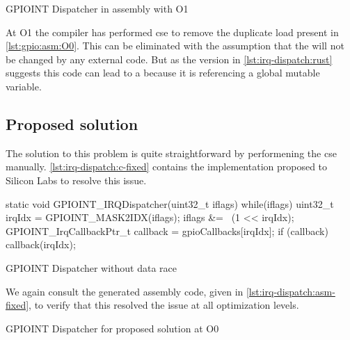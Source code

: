 \begin{listing}[H]
  \caption{GPIOINT Dispatcher in assembly with O1}
  \label{lst:gpio:asm:O1}
\end{listing}

At O1 the compiler has performed \gls{cse} to remove the duplicate load present in \autoref{lst:gpio:asm:O0}.
This can be eliminated with the assumption that the  will not be changed by any external code.
But as the {\rust} version in \autoref{lst:irq-dispatch:rust} suggests this code can lead to a  because it is referencing a global mutable variable.

\subsection{Proposed solution}

The solution to this problem is quite straightforward by performening the \gls{cse} manually.
\autoref{lst:irq-dispatch:c-fixed} contains the implementation proposed to Silicon Labs to resolve this issue.

\begin{listing}[H]
  \begin{ccode}
static void GPIOINT_IRQDispatcher(uint32_t iflags) {
  while(iflags) {
    uint32_t irqIdx = GPIOINT_MASK2IDX(iflags);
    iflags &= ~(1 << irqIdx);
    GPIOINT_IrqCallbackPtr_t callback = gpioCallbacks[irqIdx];
    if (callback) {
      callback(irqIdx);
    }
  }
}
  \end{ccode}
  \caption{GPIOINT Dispatcher without data race}
  \label{lst:irq-dispatch:c-fixed}
\end{listing}

We again consult the generated assembly code, given in \autoref{lst:irq-dispatch:asm-fixed}, to verify that this resolved the issue at all optimization levels.

\begin{listing}[H]
  \caption{GPIOINT Dispatcher for proposed solution at O0}
  \label{lst:irq-dispatch:asm-fixed}
\end{listing}

